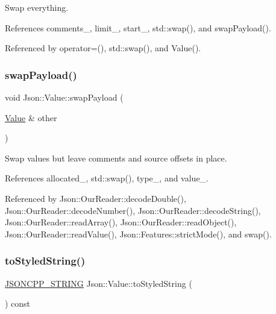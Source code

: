 Swap everything. 



References comments\+\_\+, limit\+\_\+, start\+\_\+, std\+::swap(), and swap\+Payload().



Referenced by operator=(), std\+::swap(), and Value().

\mbox{\label{classJson_1_1Value_a5263476047f20e2fc6de470e4de34fe5_a5263476047f20e2fc6de470e4de34fe5}} 
\subsubsection{\texorpdfstring{swap\+Payload()}{swapPayload()}}
{\footnotesize\ttfamily void Json\+::\+Value\+::swap\+Payload (\begin{DoxyParamCaption}\item[{\hyperlink{classJson_1_1Value}{Value} \&}]{other }\end{DoxyParamCaption})}



Swap values but leave comments and source offsets in place. 



References allocated\+\_\+, std\+::swap(), type\+\_\+, and value\+\_\+.



Referenced by Json\+::\+Our\+Reader\+::decode\+Double(), Json\+::\+Our\+Reader\+::decode\+Number(), Json\+::\+Our\+Reader\+::decode\+String(), Json\+::\+Our\+Reader\+::read\+Array(), Json\+::\+Our\+Reader\+::read\+Object(), Json\+::\+Our\+Reader\+::read\+Value(), Json\+::\+Features\+::strict\+Mode(), and swap().

\mbox{\label{classJson_1_1Value_a00154cc8662d7a845ed59e175c2496cb_a00154cc8662d7a845ed59e175c2496cb}} 
\subsubsection{\texorpdfstring{to\+Styled\+String()}{toStyledString()}}
{\footnotesize\ttfamily \hyperlink{json_8h_a1e723f95759de062585bc4a8fd3fa4be_a1e723f95759de062585bc4a8fd3fa4be}{J\+S\+O\+N\+C\+P\+P\+\_\+\+S\+T\+R\+I\+NG} Json\+::\+Value\+::to\+Styled\+String (\begin{DoxyParamCaption}{ }\end{DoxyParamCaption}) const}



